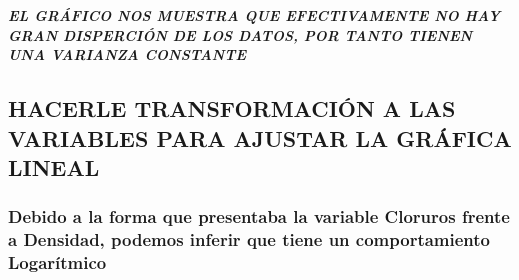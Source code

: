 \documentclass[11pt]{article}
\begin{document}
    \begin{center}
    \end{center}
    { \hspace*{\fill} \\}
    
    \subparagraph{EL GRÁFICO NOS MUESTRA QUE EFECTIVAMENTE NO HAY GRAN
DISPERCIÓN DE LOS DATOS, POR TANTO TIENEN UNA VARIANZA
CONSTANTE}\label{el-gruxe1fico-nos-muestra-que-efectivamente-no-hay-gran-disperciuxf3n-de-los-datos-por-tanto-tienen-una-varianza-constante}

    \subsection{HACERLE TRANSFORMACIÓN A LAS VARIABLES PARA AJUSTAR LA
GRÁFICA
LINEAL}\label{hacerle-transformaciuxf3n-a-las-variables-para-ajustar-la-gruxe1fica-lineal}

    \subsubsection{Debido a la forma que presentaba la variable Cloruros
frente a Densidad, podemos inferir que tiene un comportamiento
Logarítmico}\label{debido-a-la-forma-que-presentaba-la-variable-cloruros-frente-a-densidad-podemos-inferir-que-tiene-un-comportamiento-logaruxedtmico}
\end{document}
